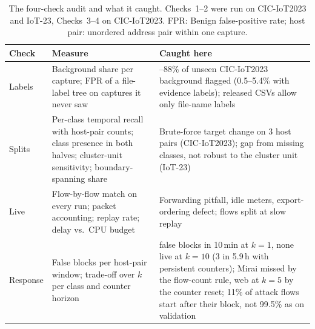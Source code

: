 \begin{table}[t]
\centering
\caption{The four-check audit and what it caught. Checks~1--2 were run on CIC-IoT2023 and IoT-23, Checks~3--4 on CIC-IoT2023. FPR: Benign false-positive rate; host pair: unordered address pair within one capture.}
\label{tab:checklist}
\footnotesize
\setlength{\tabcolsep}{3pt}
\begin{tabular}{>{\raggedright\arraybackslash}p{1.55cm}>{\raggedright\arraybackslash}p{3.2cm}>{\raggedright\arraybackslash}p{3.25cm}}
\hline
Check & Measure & Caught here \\
\hline
1 Labels & Background share per capture; FPR of a file-label tree on captures it never saw & 71--88\% of unseen CIC-IoT2023 background flagged (0.5--5.4\% with evidence labels); released CSVs allow only file-name labels \\
2 Splits & Per-class temporal recall with host-pair counts; class presence in both halves; cluster-unit sensitivity; boundary-spanning share & Brute-force target change on 3 host pairs (CIC-IoT2023); gap from missing classes, not robust to the cluster unit (IoT-23) \\
3 Live & Flow-by-flow match on every run; packet accounting; replay rate; delay vs.\ CPU budget & Forwarding pitfall, idle meters, export-ordering defect; flows split at slow replay \\
4 Response & False blocks per host-pair window; trade-off over $k$ per class and counter horizon & 60 false blocks in 10\,min at $k=1$, none live at $k=10$ (3 in 5.9\,h with persistent counters); Mirai missed by the flow-count rule, web at $k=5$ by the counter reset; 11\% of attack flows start after their block, not 99.5\% as on validation \\
\hline
\end{tabular}
\end{table}
